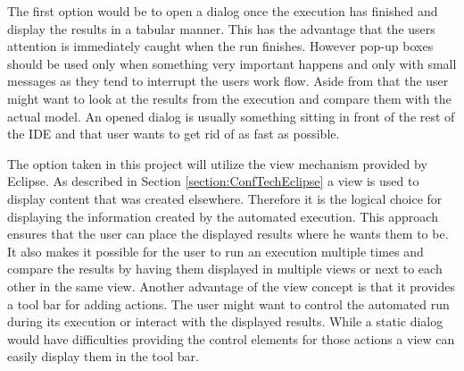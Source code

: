 The first option would be to open a dialog once the execution has finished
and display the results in a tabular manner. This has the advantage that the
users attention is immediately caught when the run finishes. However pop-up boxes
should be used only when something very important happens and only with small messages
as they tend to interrupt the users work flow. Aside from that the user might want
to look at the results from the execution and compare them with the actual model.
An opened dialog is usually something sitting in front of the rest of the \ac{IDE}
and that user wants to get rid of as fast as possible.

The option taken in this project will utilize the view mechanism provided by Eclipse. As described
in Section \ref{section:ConfTechEclipse} a view is used to display content that was created
elsewhere. Therefore it is the logical choice for displaying the information created by the automated
execution. This approach ensures that the user can place the displayed results where he wants them to be.
It also makes it possible for the user to run an execution multiple times and compare the
results by having them displayed in multiple views or next to each other in the same view.
Another advantage of the view concept is that it provides a tool bar for adding actions.
The user might want to control the automated run during its execution or interact with
the displayed results. While a static dialog would have difficulties providing the control elements
for those actions a view can easily display them in the tool bar.
